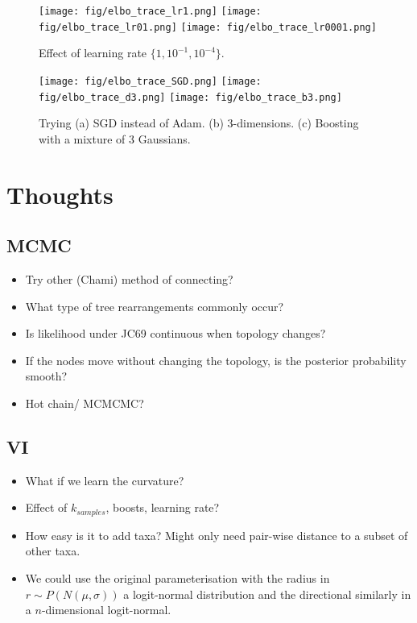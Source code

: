 \documentclass[11pt]{article}
\begin{document}
\begin{figure}[htbp]
\begin{center}
\texttt{[image: fig/elbo\_trace\_lr1.png]}%
\texttt{[image: fig/elbo\_trace\_lr01.png]}%
\texttt{[image: fig/elbo\_trace\_lr0001.png]}
\caption{Effect of learning rate $\{1, 10^{-1}, 10^{-4}\}$.}
\label{fig:lr}
\end{center}
\end{figure}

\begin{figure}[htbp]
\begin{center}
\texttt{[image: fig/elbo\_trace\_SGD.png]}%
\texttt{[image: fig/elbo\_trace\_d3.png]}%
\texttt{[image: fig/elbo\_trace\_b3.png]}
\caption{Trying (a) SGD instead of Adam. (b) 3-dimensions. (c) Boosting with a mixture of 3 Gaussians.}
\label{fig:lr}
\end{center}
\end{figure}


\section{Thoughts}
\subsection{MCMC}
\begin{itemize}
\item Try other (Chami) method of connecting?
\item What type of tree rearrangements commonly occur?
\item Is likelihood under JC69 continuous when topology changes?
\item If the nodes move without changing the topology, is the posterior probability smooth?
\item Hot chain/ MCMCMC?
\end{itemize}

\subsection{VI}
\begin{itemize}
\item What if we learn the curvature?
\item Effect of $k_{samples}$, boosts, learning rate?
\item How easy is it to add taxa? Might only need pair-wise distance to a subset of other taxa.
\item We could use the original parameterisation with the radius in $r \sim P(N(\mu, \sigma))$ a logit-normal distribution and the directional similarly in a $n$-dimensional logit-normal.
\end{itemize}
\end{document}
